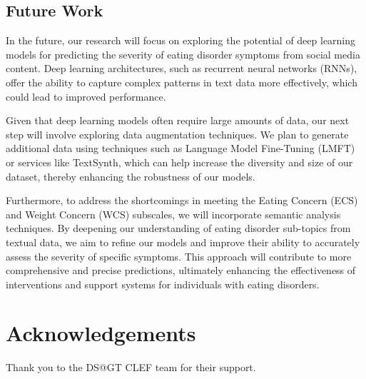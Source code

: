 \documentclass[]{style/ceurart}
\begin{document}
\subsection{Future Work}

In the future, our research will focus on exploring the potential of deep learning models for predicting the severity of eating disorder symptoms from social media content. Deep learning architectures, such as recurrent neural networks (RNNs), offer the ability to capture complex patterns in text data more effectively, which could lead to improved performance.

Given that deep learning models often require large amounts of data, our next step will involve exploring data augmentation techniques. We plan to generate additional data using techniques such as Language Model Fine-Tuning (LMFT) or services like TextSynth, which can help increase the diversity and size of our dataset, thereby enhancing the robustness of our models.

Furthermore, to address the shortcomings in meeting the Eating Concern (ECS) and Weight Concern (WCS) subscales, we will incorporate semantic analysis techniques. By deepening our understanding of eating disorder sub-topics from textual data, we aim to refine our models and improve their ability to accurately assess the severity of specific symptoms. This approach will contribute to more comprehensive and precise predictions, ultimately enhancing the effectiveness of interventions and support systems for individuals with eating disorders.


\section*{Acknowledgements}

Thank you to the DS@GT CLEF team for their support.



\end{document}

